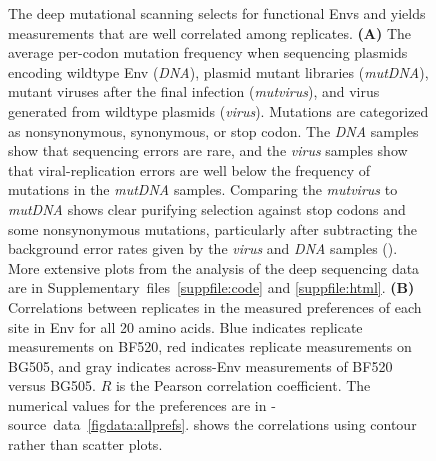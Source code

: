 \documentclass[9pt]{elife}
\begin{document}
\begin{figure}
\caption{\label{fig:mutfreqs}
The deep mutational scanning selects for functional Envs and yields measurements that are well correlated among replicates.
{\bf (A)}
The average per-codon mutation frequency when sequencing plasmids encoding wildtype Env (\emph{DNA}), plasmid mutant libraries (\emph{mutDNA}), mutant viruses after the final infection (\emph{mutvirus}), and virus generated from wildtype plasmids (\emph{virus}).
Mutations are categorized as nonsynonymous, synonymous, or stop codon. 
The \emph{DNA} samples show that sequencing errors are rare, and the \emph{virus} samples show that viral-replication errors are well below the frequency of mutations in the \emph{mutDNA} samples.
Comparing the \emph{mutvirus} to \emph{mutDNA} shows clear purifying selection against stop codons and some nonsynonymous mutations, particularly after subtracting the background error rates given by the \emph{virus} and \emph{DNA} samples ().
More extensive plots from the analysis of the deep sequencing data are in Supplementary~files~\ref{suppfile:code} and \ref{suppfile:html}.
{\bf (B)}
Correlations between replicates in the measured preferences of each site in Env for all 20 amino acids.
Blue indicates replicate measurements on BF520, red indicates replicate measurements on BG505, and gray indicates across-Env measurements of BF520 versus BG505.
$R$ is the Pearson correlation coefficient. 
The numerical values for the preferences are in -source~data~\ref{figdata:allprefs}.
 shows the correlations using contour rather than scatter plots.
}
{}
\end{figure}
\end{document}

